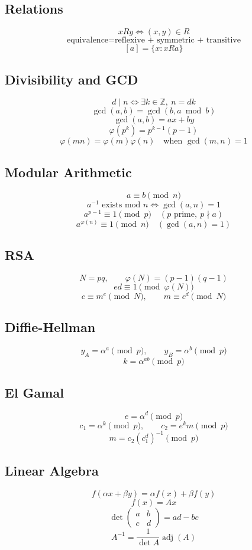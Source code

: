 \documentclass[12pt]{article}
\begin{document}
\subsection{Relations}
\[
xRy\iff(x,y)\in R
\]
\[
\text{equivalence} = \text{reflexive + symmetric + transitive}
\]
\[
[a]=\{x:xRa\}
\]

\subsection{Divisibility and GCD}
\[
d\mid n\iff\exists k\in\mathbb Z,\ n=dk
\]
\[
\gcd(a,b)=\gcd(b,a\bmod b)
\]
\[
\gcd(a,b)=ax+by
\]
\[
\varphi(p^k)=p^{k-1}(p-1)
\]
\[
\varphi(mn)=\varphi(m)\varphi(n)\quad\text{when }\gcd(m,n)=1
\]

\subsection{Modular Arithmetic}
\[
a\equiv b\pmod n
\]
\[
a^{-1}\text{ exists mod }n\iff\gcd(a,n)=1
\]
\[
a^{p-1}\equiv1\pmod p\quad(p\text{ prime},\ p\nmid a)
\]
\[
a^{\varphi(n)}\equiv1\pmod n\quad(\gcd(a,n)=1)
\]

\subsection{RSA}
\[
N=pq,
\qquad
\varphi(N)=(p-1)(q-1)
\]
\[
ed\equiv1\pmod{\varphi(N)}
\]
\[
c\equiv m^e\pmod N,
\qquad
m\equiv c^d\pmod N
\]

\subsection{Diffie-Hellman}
\[
y_A=\alpha^a\pmod p,
\qquad y_B=\alpha^b\pmod p
\]
\[
k=\alpha^{ab}\pmod p
\]

\subsection{El Gamal}
\[
e=\alpha^d\pmod p
\]
\[
c_1=\alpha^k\pmod p,
\qquad c_2=e^k m\pmod p
\]
\[
m=c_2(c_1^d)^{-1}\pmod p
\]

\subsection{Linear Algebra}
\[
f(\alpha x+\beta y)=\alpha f(x)+\beta f(y)
\]
\[
f(x)=Ax
\]
\[
\det\begin{pmatrix}a&b\\c&d\end{pmatrix}=ad-bc
\]
\[
A^{-1}=\frac{1}{\det A}\operatorname{adj}(A)
\]
\end{document}
